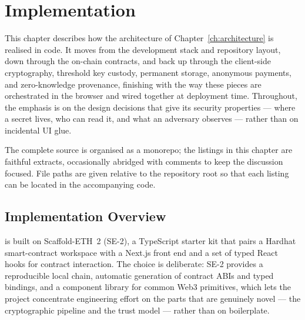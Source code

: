 \chapter{Implementation}
\label{ch:implementation}

This chapter describes how the architecture of Chapter~\ref{ch:architecture} is
realised in code. It moves from the development stack and repository layout, down
through the on-chain contracts, and back up through the client-side cryptography,
threshold key custody, permanent storage, anonymous payments, and zero-knowledge
provenance, finishing with the way these pieces are orchestrated in the browser
and wired together at deployment time. Throughout, the emphasis is on the design
decisions that give \zkw its security properties --- where a secret lives, who can
read it, and what an adversary observes --- rather than on incidental UI glue.

The complete source is organised as a monorepo; the listings in this chapter are
faithful extracts, occasionally abridged with comments to keep the discussion
focused. File paths are given relative to the repository root so that each listing
can be located in the accompanying code.

\section{Implementation Overview}
\label{sec:impl-overview}

\zkw is built on Scaffold-ETH~2 (SE-2), a TypeScript starter kit that pairs a
Hardhat smart-contract workspace with a Next.js front end and a set of typed
React hooks for contract interaction. The choice is deliberate: SE-2 provides a
reproducible local chain, automatic generation of contract ABIs and typed
bindings, and a component library for common Web3 primitives, which lets the
project concentrate engineering effort on the parts that are genuinely novel --- the
cryptographic pipeline and the trust model --- rather than on boilerplate.

